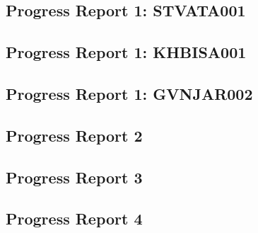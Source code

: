 \newpage
\vspace*{\fill}
\begin{center}
\subsection*{Progress Report 1: STVATA001}
\end{center}
\vspace*{\fill}


\newpage
\vspace*{\fill}
\begin{center}
\subsection*{Progress Report 1: KHBISA001}
\end{center}
\vspace*{\fill}


\newpage
\vspace*{\fill}
\begin{center}
\subsection*{Progress Report 1: GVNJAR002}
\end{center}
\vspace*{\fill}
%

\newpage
\vspace*{\fill}
\begin{center}
\subsection*{Progress Report 2}
\end{center}
\vspace*{\fill}


\newpage
\vspace*{\fill}
\begin{center}
\subsection*{Progress Report 3}
\end{center}
\vspace*{\fill}


\newpage
\vspace*{\fill}
\begin{center}
\subsection*{Progress Report 4}
\end{center}
\vspace*{\fill}



